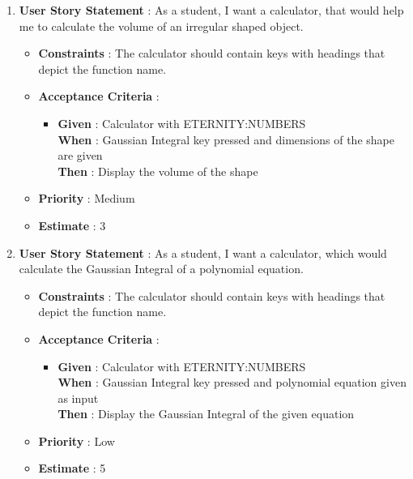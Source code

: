 \documentclass{article}
\begin{document}
\begin{enumerate}
        \item \textbf{User Story Statement} : As a student, I want a calculator, that would help me to calculate the volume of an irregular shaped object.
    \begin{itemize}
        \item \textbf{Constraints} : The calculator should contain keys with headings that depict the function name. 
        \item \textbf{Acceptance Criteria} : 
            \begin{itemize}
                \item \textbf{Given} : Calculator with ETERNITY:NUMBERS \\
                \textbf{When} : Gaussian Integral key pressed and dimensions of the shape are given \\
                \textbf{Then} : Display the volume of the shape 
            \end{itemize}
        \item \textbf{Priority} : Medium
        \item \textbf{Estimate} : 3
    \end{itemize}
    
        \item \textbf{User Story Statement} : As a student, I want a calculator, which would calculate the Gaussian Integral of a polynomial equation.
    \begin{itemize}
        \item \textbf{Constraints} : The calculator should contain keys with headings that depict the function name. 
        \item \textbf{Acceptance Criteria} : 
            \begin{itemize}
                \item \textbf{Given} : Calculator with ETERNITY:NUMBERS \\
                \textbf{When} : Gaussian Integral key pressed and polynomial equation given as input\\
                \textbf{Then} : Display the Gaussian Integral of the given equation
            \end{itemize}
        \item \textbf{Priority} : Low
        \item \textbf{Estimate} : 5
    \end{itemize}
    

\end{enumerate}
\end{document}
